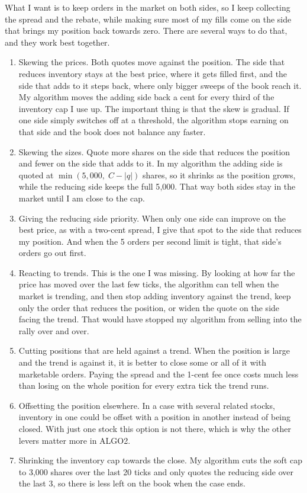 \documentclass{article}
\begin{document}
What I want is to keep orders in the market on both sides, so I keep collecting the spread and the rebate, while making sure most of my fills come on the side that brings my position back towards zero. There are several ways to do that, and they work best together.
\begin{enumerate}
  \item Skewing the prices. Both quotes move against the position. The side that reduces inventory stays at the best price, where it gets filled first, and the side that adds to it steps back, where only bigger sweeps of the book reach it. My algorithm moves the adding side back a cent for every third of the inventory cap I use up. The important thing is that the skew is gradual. If one side simply switches off at a threshold, the algorithm stops earning on that side and the book does not balance any faster.
  \item Skewing the sizes. Quote more shares on the side that reduces the position and fewer on the side that adds to it. In my algorithm the adding side is quoted at $\min(5{,}000,\; C - |q|)$ shares, so it shrinks as the position grows, while the reducing side keeps the full 5{,}000. That way both sides stay in the market until I am close to the cap.
  \item Giving the reducing side priority. When only one side can improve on the best price, as with a two-cent spread, I give that spot to the side that reduces my position. And when the 5 orders per second limit is tight, that side's orders go out first.
  \item Reacting to trends. This is the one I was missing. By looking at how far the price has moved over the last few ticks, the algorithm can tell when the market is trending, and then stop adding inventory against the trend, keep only the order that reduces the position, or widen the quote on the side facing the trend. That would have stopped my algorithm from selling into the rally over and over.
  \item Cutting positions that are held against a trend. When the position is large and the trend is against it, it is better to close some or all of it with marketable orders. Paying the spread and the 1-cent fee once costs much less than losing on the whole position for every extra tick the trend runs.
  \item Offsetting the position elsewhere. In a case with several related stocks, inventory in one could be offset with a position in another instead of being closed. With just one stock this option is not there, which is why the other levers matter more in ALGO2.
  \item Shrinking the inventory cap towards the close. My algorithm cuts the soft cap to 3{,}000 shares over the last 20 ticks and only quotes the reducing side over the last 3, so there is less left on the book when the case ends.
\end{enumerate}
\end{document}
